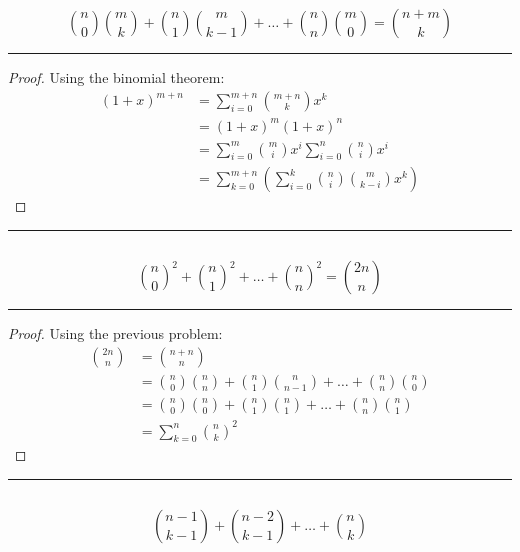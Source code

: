 \documentclass[openany, amssymb, psamsfonts]{amsart}
\theoremstyle{definition}
\numberwithin{equation}{section}
\begin{document}
\subsection{}
\[\binom{n}{0}\binom{m}{k} + \binom{n}{1}\binom{m}{k-1} + \dots + \binom{n}{n}\binom{m}{0} = \binom{n+m}{k}\]
\vspace{4pt}     \hrule   \vspace{4pt}\begin{proof}
Using the binomial theorem:
\begin{align*}
(1+x)^{m+n} &= \sum_{i=0}^{m+n}\binom{m+n}{k}x^k\\
&= (1+x)^m(1+x)^n\\
&= \sum_{i=0}^m\binom{m}{i}x^i \sum_{i=0}^n\binom{n}{i}x^i\\
&= \sum_{k=0}^{m+n}(\sum_{i=0}^k\binom{n}{i}\binom{m}{k-i}x^k)
\end{align*}
\end{proof}\vspace{4pt}     \hrule   \vspace{4pt}

\subsection{}
\[\binom{n}{0}^2 + \binom{n}{1}^2 + \dots + \binom{n}{n}^2 = \binom{2n}{n}\]
\vspace{4pt}     \hrule   \vspace{4pt}\begin{proof}
Using the previous problem:
\begin{align*}
\binom{2n}{n} &=\binom{n+n}{n}\\
&= \binom{n}{0}\binom{n}{n}  + \binom{n}{1}\binom{n}{n-1} + \dots + \binom{n}{n}\binom{n}{0}\\
\tag{Identity 1}
&=\binom{n}{0}\binom{n}{0}  + \binom{n}{1}\binom{n}{1} + \dots + \binom{n}{n}\binom{n}{1}\\
&= \sum_{k=0}^n \binom{n}{k}^2
\end{align*}
\end{proof}\vspace{4pt}     \hrule   \vspace{4pt}

\subsection{}
\[\binom{n-1}{k-1} + \binom{n-2}{k-1} + \dots + \binom{n}{k}\]
\end{document}
